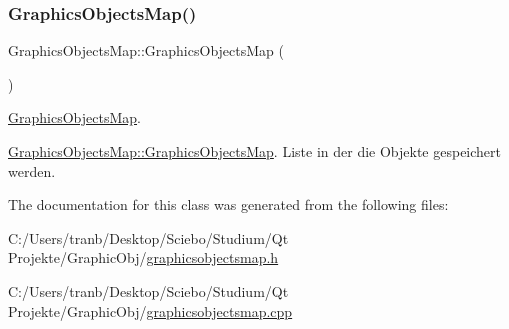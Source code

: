 \subsubsection{\texorpdfstring{Graphics\+Objects\+Map()}{GraphicsObjectsMap()}}
{\footnotesize\ttfamily Graphics\+Objects\+Map\+::\+Graphics\+Objects\+Map (\begin{DoxyParamCaption}{ }\end{DoxyParamCaption})}



\hyperlink{class_graphics_objects_map}{Graphics\+Objects\+Map}. 

\hyperlink{class_graphics_objects_map_a15a79dc2d1a2ab517cf5c5ccce3f05bc}{Graphics\+Objects\+Map\+::\+Graphics\+Objects\+Map}. Liste in der die Objekte gespeichert werden. 

The documentation for this class was generated from the following files\+:\begin{DoxyCompactItemize}
\item 
C\+:/\+Users/tranb/\+Desktop/\+Sciebo/\+Studium/\+Qt Projekte/\+Graphic\+Obj/\hyperlink{graphicsobjectsmap_8h}{graphicsobjectsmap.\+h}\item 
C\+:/\+Users/tranb/\+Desktop/\+Sciebo/\+Studium/\+Qt Projekte/\+Graphic\+Obj/\hyperlink{graphicsobjectsmap_8cpp}{graphicsobjectsmap.\+cpp}\end{DoxyCompactItemize}
